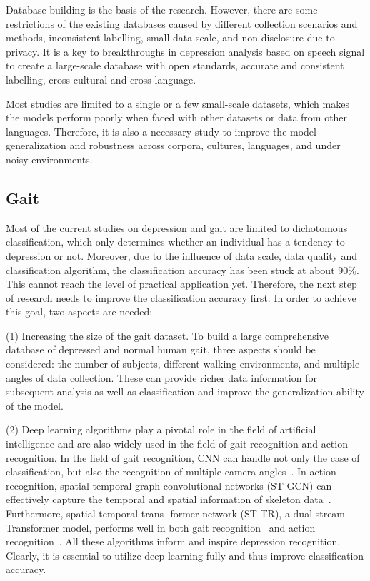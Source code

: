 Database building is the basis of the research.
However, there are some restrictions of the existing databases caused by different collection scenarios and methods, inconsistent labelling, small data scale, and non-disclosure due to privacy.
It is a key to breakthroughs in depression analysis based on speech signal to create a large-scale database with
open standards, accurate and consistent labelling, cross-cultural and cross-language.


Most studies are limited to a single or a few small-scale datasets, which makes the models
perform poorly when faced with other datasets or data from other languages.
Therefore, it is also a necessary study to improve the model generalization and robustness across corpora, cultures, languages, and under noisy environments.

\subsection{Gait}


Most of the current studies on depression and gait are limited to dichotomous classification, which only determines whether an individual has a tendency to depression or not. Moreover, due to the influence of data scale, data quality and classification algorithm, the classification accuracy has been stuck at about 90\%.
This cannot reach the level of practical application yet.
Therefore, the next step of research needs to improve the classification accuracy first.
In order to achieve this goal, two aspects are needed:

(1) Increasing the size of the gait dataset.
To build a large comprehensive database of depressed and normal human gait, three aspects should be considered: the number of subjects, different walking environments, and multiple angles of data collection. These can provide richer data information for subsequent analysis as well as classification and improve the generalization ability of the model.

(2) Deep learning algorithms play a pivotal role in the field of artificial intelligence and are also widely used in the field of gait recognition and action recognition. In the field of gait recognition, CNN can
handle not only the case of classification, but also the recognition of multiple camera angles~\cite{ismail1999discrete}.
In action recognition, spatial temporal graph convolutional networks (ST-GCN) can effectively capture the temporal and spatial information of skeleton data~\cite{yan2018spatial}. Furthermore, spatial temporal trans-
former network (ST-TR), a dual-stream Transformer model, performs well in both gait recognition~\cite{zhang2022spatial} and action recognition~\cite{plizzari2021skeleton}.  All these algorithms inform and inspire depression recognition. Clearly, it is essential to utilize deep learning fully and thus improve classification accuracy.


